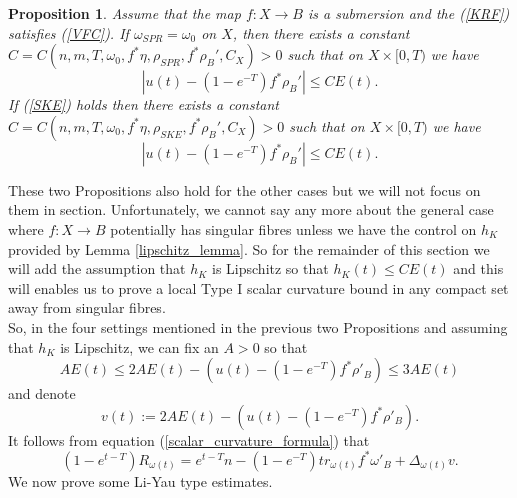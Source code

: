 \documentclass[12pt]{article}
\newtheorem{proposition}[theorem]{Proposition}
\numberwithin{equation}{section}
\begin{document}
\begin{proposition}
Assume that the map $f: X \to B$ is a submersion and the (\ref{KRF}) satisfies (\ref{VFC}). If $\omega_{SPR} = \omega_{0}$ on $X$, then there exists a constant $C = C(n,m,T,\omega_0,f^*\eta, \rho_{SPR}, f^*\rho_B',C_X) > 0$ such that on $X \times [0,T)$ we have
\begin{equation*}
    \left|u(t) - (1-e^{-T}) f^*\rho_B'\right| \leq CE(t).
\end{equation*}
If (\ref{SKE}) holds then there exists a constant $C = C(n,m,T,\omega_0,f^*\eta, \rho_{SKE},f^*\rho_B',C_X) > 0$ such that on $X \times [0,T)$ we have
\begin{equation*}
    \left|u(t) - (1-e^{-T}) f^*\rho_B'\right| \leq CE(t).
\end{equation*}
\end{proposition}

\noindent These two Propositions also hold for the other cases but we will not focus on them in section. Unfortunately, we cannot say any more about the general case where $f: X \to B$ potentially has singular fibres unless we have the control on $h_K$ provided by Lemma \ref{lipschitz_lemma}. So for the remainder of this section we will add the assumption that $h_K$ is Lipschitz so that $h_K(t) \leq CE(t)$ and this will enables us to prove a local Type I scalar curvature bound in any compact set away from singular fibres.\\

\noindent So, in the four settings mentioned in the previous two Propositions and assuming that $h_K$ is Lipschitz, we can fix an $A > 0$ so that
\begin{equation*}
    A E(t) \leq 2AE(t) - (u(t)- (1-e^{-T})f^*\rho'_B) \leq 3AE(t)
\end{equation*}
and denote
\begin{equation*}
    v(t):= 2AE(t) - (u(t)- (1-e^{-T})f^*\rho'_B).
\end{equation*}
It follows from equation (\ref{scalar_curvature_formula}) that 
\begin{equation*}
    (1-e^{t-T}) R_{\omega(t)} = e^{t-T} n - (1-e^{-T})tr_{\omega(t)} f^*\omega'_B + \Delta_{\omega(t)} v.
\end{equation*}
We now prove some Li-Yau type estimates.
\end{document}

